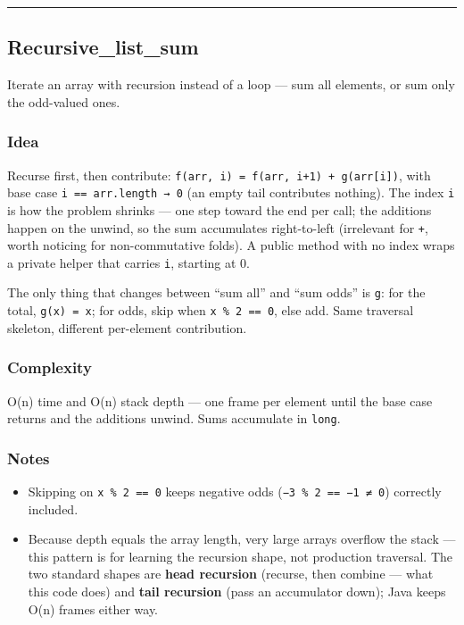 \documentclass[
  10pt,
  letterpaper,
  onecolumn]{article}
\providecommand{\tightlist}{%
  \setlength{\itemsep}{0pt}\setlength{\parskip}{0pt}}
\begin{document}
\begin{center}\rule{0.5\linewidth}{0.5pt}\end{center}

\hypertarget{recursive_list_sum}{%
\subsection{Recursive\_list\_sum}\label{recursive_list_sum}}

Iterate an array with recursion instead of a loop --- sum all elements,
or sum only the odd-valued ones.

\hypertarget{idea-2}{%
\subsubsection{Idea}\label{idea-2}}

Recurse first, then contribute:
\texttt{f(arr,\ i)\ =\ f(arr,\ i+1)\ +\ g(arr{[}i{]})}, with base case
\texttt{i\ ==\ arr.length\ →\ 0} (an empty tail contributes nothing).
The index \texttt{i} is how the problem shrinks --- one step toward the
end per call; the additions happen on the unwind, so the sum accumulates
right-to-left (irrelevant for \texttt{+}, worth noticing for
non-commutative folds). A public method with no index wraps a private
helper that carries \texttt{i}, starting at 0.

The only thing that changes between ``sum all'' and ``sum odds'' is
\texttt{g}: for the total, \texttt{g(x)\ =\ x}; for odds, skip when
\texttt{x\ \%\ 2\ ==\ 0}, else add. Same traversal skeleton, different
per-element contribution.

\hypertarget{complexity-2}{%
\subsubsection{Complexity}\label{complexity-2}}

O(n) time and O(n) stack depth --- one frame per element until the base
case returns and the additions unwind. Sums accumulate in \texttt{long}.

\hypertarget{notes-1}{%
\subsubsection{Notes}\label{notes-1}}

\begin{itemize}
\tightlist
\item
  Skipping on \texttt{x\ \%\ 2\ ==\ 0} keeps negative odds
  (\texttt{−3\ \%\ 2\ ==\ −1\ ≠\ 0}) correctly included.
\item
  Because depth equals the array length, very large arrays overflow the
  stack --- this pattern is for learning the recursion shape, not
  production traversal. The two standard shapes are \textbf{head
  recursion} (recurse, then combine --- what this code does) and
  \textbf{tail recursion} (pass an accumulator down); Java keeps O(n)
  frames either way.
\end{itemize}
\end{document}
